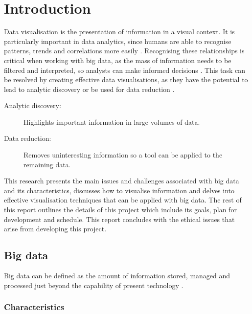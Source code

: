 \documentclass[
	fontsize=11pt
	headlines=2,
	footlines=2,
	parskip=half
]{scrartcl}
\begin{document}
	\section{Introduction} {
	\label{sec:introduction}
		
		Data visualisation is the presentation of information in a visual context. It is particularly important in data analytics, since humans are able to recognise patterns, trends and correlations more easily \citep{grinstein2002introduction}. Recognising these relationships is critical when working with big data, as the mass of information needs to be filtered and interpreted, so analysts can make informed decisions \citep{hendley1995case}. This task can be resolved by creating effective data visualisations, as they have the potential to lead to analytic discovery or be used for data reduction \citep{rohrer1997web}.
		
		\begin{description}
			\item[Analytic discovery:] Highlights important information in large volumes of data.
			\item[Data reduction:] Removes uninteresting information so a tool can be applied to the remaining data.
		\end{description}
		
		This research presents the main issues and challenges associated with big data and its characteristics, discusses how to visualise information and delves into effective visualisation techniques that can be applied with big data. The rest of this report outlines the details of this project which include its goals, plan for development and schedule. This report concludes with the ethical issues that arise from developing this project.
		
		\subsection{Big data} {
		
			Big data can be defined as the amount of information stored, managed and processed just beyond the capability of present technology \citep{kaisler2013big}.
			
			\subsubsection{Characteristics} {
			
}}}
\end{document}
